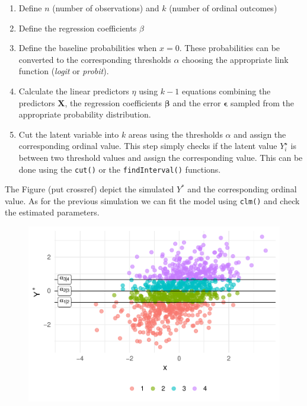 \documentclass[
  man,floatsintext]{apa6}
\providecommand{\tightlist}{%
  \setlength{\itemsep}{0pt}\setlength{\parskip}{0pt}}
\begin{document}
\begin{enumerate}
\def\labelenumi{\arabic{enumi}.}
\tightlist
\item
  Define \(n\) (number of observations) and \(k\) (number of ordinal outcomes)
\item
  Define the regression coefficients \(\beta\)
\item
  Define the baseline probabilities when \(x = 0\). These probabilities can be converted to the corresponding thresholds \(\alpha\) choosing the appropriate link function (\emph{logit} or \emph{probit}).
\item
  Calculate the linear predictors \(\eta\) using \(k - 1\) equations combining the predictors \(\mathbf{X}\), the regression coefficients \(\mathbf{\beta}\) and the error \(\mathbf{\epsilon}\) sampled from the appropriate probability distribution.
\item
  Cut the latent variable into \(k\) areas using the thresholds \(\alpha\) and assign the corresponding ordinal value. This step simply checks if the latent value \(Y^{\star}_i\) is between two threshold values and assign the corresponding value. This can be done using the \texttt{cut()} or the \texttt{findInterval()} functions.
\end{enumerate}

\scriptsize

\normalsize

The Figure (put crossref) depict the simulated \(Y^{*}\) and the corresponding ordinal value. As for the previous simulation we can fit the model using \texttt{clm()} and check the estimated parameters.

\scriptsize

\begin{figure}

{\centering \includegraphics{paper-new_files/figure-latex/unnamed-chunk-17-1} 

}

\caption{ }\label{fig:unnamed-chunk-17}
\end{figure}
\end{document}
